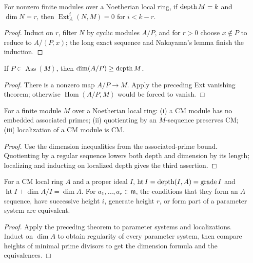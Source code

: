 \begin{theorem}[Ischebeck]\label{mcrt-thm-17-1}
For nonzero finite modules over a Noetherian local ring, if $\operatorname{depth} M=k$ and
$\dim N=r$, then $\operatorname{Ext}^i_A(N,M)=0$ for $i<k-r$.
\end{theorem}
\begin{proof}
Induct on $r$, filter $N$ by cyclic modules $A/P$, and for $r>0$ choose
$x\notin P$ to reduce to $A/(P,x)$; the long exact sequence and Nakayama's
lemma finish the induction.
\end{proof}

\begin{theorem}\label{mcrt-thm-17-2}
If $P\in\operatorname{Ass}(M)$, then $\dim(A/P)\ge\operatorname{depth} M$.
\end{theorem}
\begin{proof}
There is a nonzero map $A/P\to M$.  Apply the preceding Ext vanishing theorem;
otherwise $\operatorname{Hom}(A/P,M)$ would be forced to vanish.
\end{proof}

\begin{theorem}\label{mcrt-thm-17-3}
For a finite module $M$ over a Noetherian local ring: (i) a CM module has no
embedded associated primes; (ii) quotienting by an $M$-sequence preserves CM;
(iii) localization of a CM module is CM.
\end{theorem}
\begin{proof}
Use the dimension inequalities from the associated-prime bound.  Quotienting
by a regular sequence lowers both depth and dimension by its length; localizing
and inducting on localized depth gives the third assertion.
\end{proof}

\begin{theorem}\label{mcrt-thm-17-4}
For a CM local ring $A$ and a proper ideal $I$,
$\operatorname{ht}I=\operatorname{depth}(I,A)=\operatorname{grade}I$ and
$\operatorname{ht}I+\dim A/I=\dim A$.  For $a_1,\ldots,a_r\in\mathfrak m$,
the conditions that they form an $A$-sequence, have successive height $i$,
generate height $r$, or form part of a parameter system are equivalent.
\end{theorem}
\begin{proof}
Apply the preceding theorem to parameter systems and localizations.  Induct on
$\dim A$ to obtain regularity of every parameter system, then compare heights
of minimal prime divisors to get the dimension formula and the equivalences.
\end{proof}

